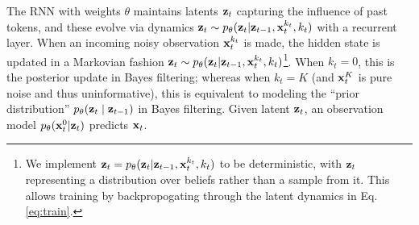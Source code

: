 

The RNN with weights $\theta$ maintains latents $\mathbf{z}_t$ capturing the influence of past tokens, and these evolve via dynamics $\mathbf{z}_t \sim p_{\theta}(\mathbf{z}_t |  \mathbf{z}_{t-1}, \mathbf{x}_t^{k_t}, k_t)$ with a recurrent layer. When an incoming noisy observation $\mathbf{x}_t^{k_t}$ is made, the hidden state is updated in a Markovian fashion $\mathbf{z}_t \sim p_{\theta}(\mathbf{z}_t | \mathbf{z}_{t-1}, \mathbf{x}_t^{k_t}, k_t)$\footnote{We implement $\mathbf{z}_t = p_{\theta}(\mathbf{z}_t | \mathbf{z}_{t-1}, \mathbf{x}_t^{k_t}, k_t)$ to be deterministic, with $\mathbf{z}_t$ representing a distribution over beliefs rather than a sample from it. This allows training by backpropogating through the latent dynamics in Eq.\eqref{eq:train}.}. When $k_t = 0$, this is the posterior update in Bayes filtering; whereas when $k_t = K$ (and $\mathbf{x}_t^K$ is pure noise and thus uninformative), this is equivalent to modeling the ``prior distribution'' $p_{\theta}(\mathbf{z}_t \mid \mathbf{z}_{t-1})$ in Bayes filtering. Given latent $\mathbf{z}_t$, an observation model $p_{\theta}(\mathbf{x}_t^0 | \mathbf{z}_t)$ predicts $\mathbf{x}_t$.


